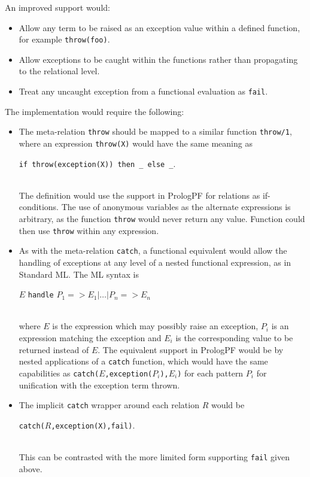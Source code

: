An improved support would:
\begin{itemize}
\item{Allow any term to be raised as an exception value within a
  defined function, for example \texttt{throw(foo)}.}
\item{Allow exceptions to be caught within the functions rather than
  propagating to the relational level.}
\item{Treat any uncaught exception from a functional evaluation as
  \texttt{fail}.}
\end{itemize}
The implementation would require the following:
\begin{itemize}
\item{The meta-relation \texttt{throw} should be mapped to a
  similar function \texttt{throw/1}, 
  where an expression \texttt{throw(X)}
  would have the same meaning as\\
  \centerline{\texttt{if throw(exception(X)) then \_{} else \_{}}.}\\
  The
  definition would use the support in PrologPF for relations
  as if-conditions.  The use of anonymous variables as
  the alternate expressions is arbitrary, as the function
  \texttt{throw} would never return any value.
  Function could then use \texttt{throw}
  within any expression.}
\item{As with the meta-relation \texttt{catch}, a functional
  equivalent would allow the handling of exceptions at any
  level of a nested functional expression, as in Standard
  ML.  The ML syntax is\\
  \centerline{$E$ \texttt{handle} $P_1 => E_1 | \ldots | P_n => E_n$}\\
  where $E$ is the expression which may possibly raise an
  exception, $P_i$ is an expression matching the exception and
  $E_i$ is the corresponding
  value to be returned instead of $E$.  The equivalent support
  in PrologPF would be by nested applications of a
  \texttt{catch} function, which would have the same capabilities as
  \texttt{catch(}$E$\texttt{,exception(}$P_i$\texttt{),}$E_i$\texttt{)} for
  each pattern $P_i$ for unification with the exception term thrown.
  }
\item{The implicit \texttt{catch} wrapper around each relation $R$
  would be\\
  \centerline{\texttt{catch(}$R$\texttt{,exception(X),fail)}.}\\
  This can
  be contrasted with the more limited form supporting \texttt{fail}
  given above.
  }
\end{itemize}


